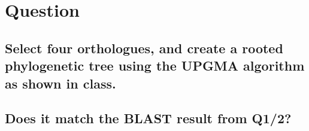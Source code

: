\section{Question}

\subsection{Select four orthologues, and create a rooted phylogenetic tree using the UPGMA algorithm as shown in class.}


\subsection{Does it match the BLAST result from Q1/2?}

\newpage

